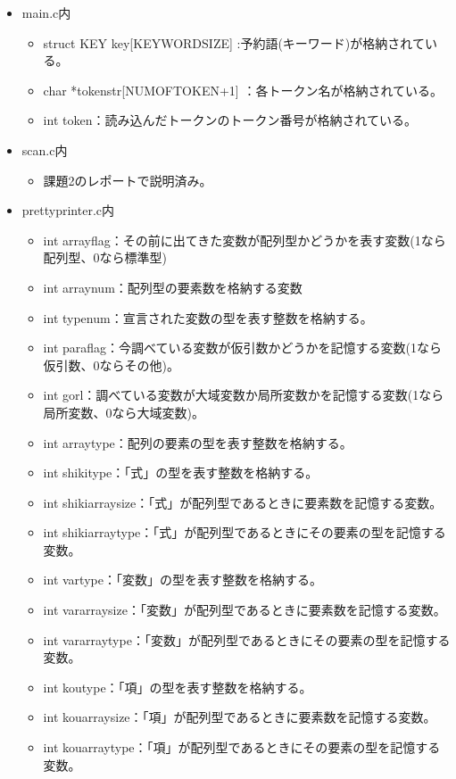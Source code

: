 \documentclass{jarticle}
\begin{document}
\begin{itemize}
  \item main.c内
  \begin{itemize}
    \item struct KEY key[KEYWORDSIZE] :予約語(キーワード)が格納されている。
    \item char *tokenstr[NUMOFTOKEN+1] ：各トークン名が格納されている。
    \item int token：読み込んだトークンのトークン番号が格納されている。
  \end{itemize}
  \item scan.c内
  \begin{itemize}
    \item 課題2のレポートで説明済み。
  \end{itemize}
  \item prettyprinter.c内
  \begin{itemize}
    \item int arrayflag：その前に出てきた変数が配列型かどうかを表す変数(1なら配列型、0なら標準型)
    \item int arraynum：配列型の要素数を格納する変数
    \item int typenum：宣言された変数の型を表す整数を格納する。
    \item int paraflag：今調べている変数が仮引数かどうかを記憶する変数(1なら仮引数、0ならその他)。
    \item int gorl：調べている変数が大域変数か局所変数かを記憶する変数(1なら局所変数、0なら大域変数)。
    \item int arraytype：配列の要素の型を表す整数を格納する。
    \item int shikitype：「式」の型を表す整数を格納する。
    \item int shikiarraysize：「式」が配列型であるときに要素数を記憶する変数。
    \item int shikiarraytype：「式」が配列型であるときにその要素の型を記憶する変数。
    \item int vartype：「変数」の型を表す整数を格納する。
    \item int vararraysize：「変数」が配列型であるときに要素数を記憶する変数。
    \item int vararraytype：「変数」が配列型であるときにその要素の型を記憶する変数。
    \item int koutype：「項」の型を表す整数を格納する。
    \item int kouarraysize：「項」が配列型であるときに要素数を記憶する変数。
    \item int kouarraytype：「項」が配列型であるときにその要素の型を記憶する変数。

\end{itemize}
\end{itemize}
\end{document}

